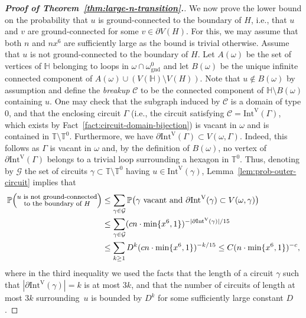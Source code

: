 \documentclass[12pt,reqno]{article}
\def\T{\mathbb{T}}
\renewcommand{\Pr}{\mathbb{P}}
\newcommand{\HH}{\mathbb{H}}
\newcommand{\ground}{\omega_{\operatorname{gnd}}}
\newcommand{\IntVert}[1]{\mathrm{Int}^\mathrm{V}(#1)}
\newcommand{\breakup}{{{\cC}}}
\newcommand{\cC}{\mathcal{C}}
\begin{document}
\begin{proof}[{\bf Proof of Theorem~\ref{thm:large-n-transition}.}]
We now prove the lower bound on the probability that $u$ is ground-connected to the boundary of $H$, i.e., that $u$ and $v$ are ground-connected for some $v \in \partial V(H)$.
For this, we may assume that both $n$ and $nx^6$ are sufficiently large as the bound is trivial otherwise.
Assume that $u$ is not ground-connected to the boundary of $H$.
Let $A(\omega)$ be the set of vertices of $\HH$ belonging to loops in $\omega \cap \ground^0$ and let $B(\omega)$ be the unique infinite connected component of $A(\omega) \cup (V(\HH) \setminus V(H))$.
Note that $u \notin B(\omega)$ by assumption and define the \emph{breakup} $\breakup$ to be the connected component of $\HH \setminus B(\omega)$ containing $u$.
One may check that the subgraph induced by $\breakup$ is a domain of type 0, and that the enclosing circuit $\Gamma$ (i.e., the circuit satisfying $\breakup = \IntVert\Gamma$, which exists by Fact~\ref{fact:circuit-domain-bijection}) is vacant in $\omega$ and is contained in $\T\setminus \T^0$.
Furthermore, we have $\partial \IntVert\Gamma \subset V(\omega,\Gamma)$. Indeed, this follows as $\Gamma$ is vacant in $\omega$ and, by the definition of $B(\omega)$, no vertex of $\partial\IntVert{\Gamma}$ belongs to a trivial loop surrounding a hexagon in $\T^0$.
Thus, denoting by $\mathcal{G}$ the set of circuits $\gamma
\subset \T \setminus \T^0$ having $u\in\IntVert\gamma$,
Lemma~\ref{lem:prob-outer-circuit} implies that
\begin{align*}
\Pr\Big(\substack{\text{\footnotesize{$u$ is not ground-connected}}\\\text{\footnotesize{to the boundary of $H$}}}\Big)
 & \le \sum_{\gamma \in \mathcal{G}}\Pr\big(\gamma\text{ vacant and }\partial\IntVert\gamma\subset V(\omega,\gamma)\big)\\
 & \le \sum_{\gamma \in \mathcal{G}} (c n \cdot \min\{x^6,1\})^{-|\partial\IntVert\gamma|/15} \\
 & \le \sum_{k \ge 1} D^{k}(c n \cdot \min\{x^6,1\})^{-k/15}
\le C(n \cdot \min\{x^6,1\})^{-c},
\end{align*}
where in the third inequality we used the facts that the length of a circuit $\gamma$ such that $|\partial \IntVert\gamma|=k$ is at most $3k$, and that the number of circuits of length at most $3k$ surrounding~$u$ is bounded by $D^k$ for some sufficiently large constant $D$.
\end{proof}






%
%




\end{document}
